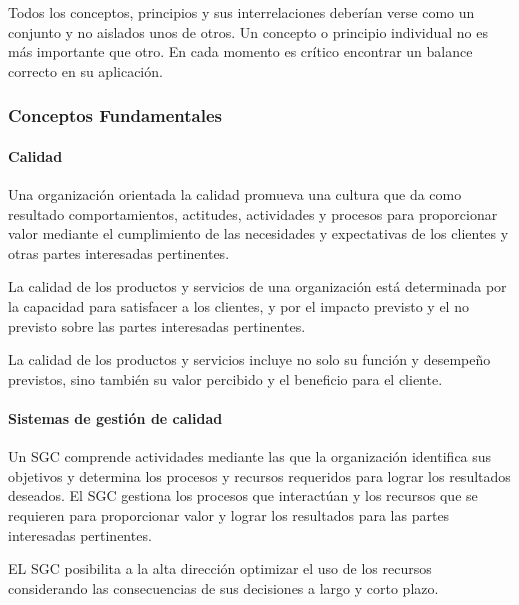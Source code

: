 				\par \noindent 
					Todos los conceptos, principios y sus interrelaciones deberían verse como un conjunto y no aislados unos de otros. Un concepto o principio individual no es más importante que otro. En cada momento es crítico encontrar un balance correcto en su aplicación.
						
			\subsubsection{Conceptos Fundamentales}
				
				\paragraph{Calidad}
					Una organización orientada la calidad promueva una cultura que da como resultado comportamientos,
					actitudes, actividades y procesos para proporcionar valor mediante el cumplimiento de las necesidades y
					expectativas de los clientes y otras partes interesadas pertinentes.
					
					\par 
						\noindent La calidad de los productos y servicios de una organización está determinada por la capacidad para
						satisfacer a los clientes, y por el impacto previsto y el no previsto sobre las partes interesadas
						pertinentes.
						
					\par 
						\noindent La calidad de los productos y servicios incluye no solo su función y desempeño previstos, sino también su valor percibido y el beneficio para el cliente.
					
				\paragraph{Sistemas de gestión de calidad}
					Un SGC comprende actividades mediante las que la organización identifica sus objetivos y determina los
					procesos y recursos requeridos para lograr los resultados deseados.
					El SGC gestiona los procesos que interactúan y los recursos que se requieren para proporcionar valor y
					lograr los resultados para las partes interesadas pertinentes.
					
					\par 
						\noindent EL SGC posibilita a la alta dirección optimizar el uso de los recursos considerando las consecuencias de sus decisiones a largo y corto plazo.
						
